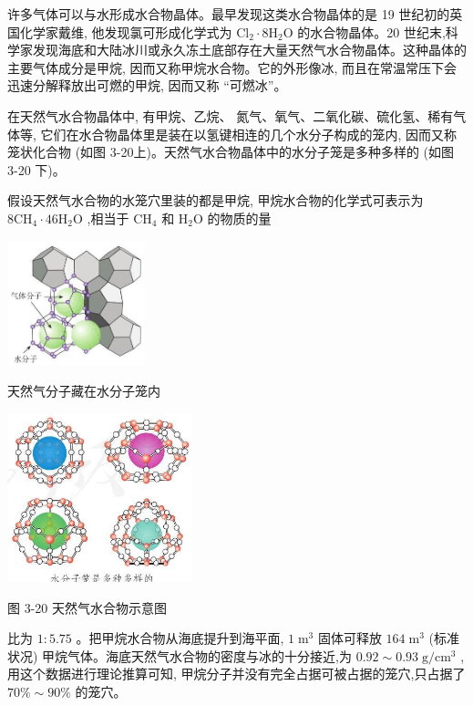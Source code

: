 \documentclass[10pt]{article}
\begin{document}
许多气体可以与水形成水合物晶体。最早发现这类水合物晶体的是 19 世纪初的英国化学家戴维, 他发现氯可形成化学式为 \({\mathrm{{Cl}}}_{2} \cdot 8{\mathrm{H}}_{2}\mathrm{O}\) 的水合物晶体。20 世纪末,科学家发现海底和大陆冰川或永久冻土底部存在大量天然气水合物晶体。这种晶体的主要气体成分是甲烷, 因而又称甲烷水合物。它的外形像冰, 而且在常温常压下会迅速分解释放出可燃的甲烷, 因而又称 “可燃冰”。

在天然气水合物晶体中, 有甲烷、乙烷、 氮气、氧气、二氧化碳、硫化氢、稀有气体等, 它们在水合物晶体里是装在以氢键相连的几个水分子构成的笼内, 因而又称笼状化合物 (如图 3-20上)。天然气水合物晶体中的水分子笼是多种多样的 (如图 3-20 下)。

假设天然气水合物的水笼穴里装的都是甲烷, 甲烷水合物的化学式可表示为 \(8{\mathrm{{CH}}}_{4} \cdot {46}{\mathrm{H}}_{2}\mathrm{O}\) ,相当于 \({\mathrm{{CH}}}_{4}\) 和 \({\mathrm{H}}_{2}\mathrm{O}\) 的物质的量

\begin{center}
\includegraphics[max width=0.3\textwidth]{images/0190e026-5a11-7df7-bd27-54d09026ba7a_83_507640.jpg}
\end{center}

天然气分子藏在水分子笼内

\begin{center}
\includegraphics[max width=0.4\textwidth]{images/0190e026-5a11-7df7-bd27-54d09026ba7a_83_242682.jpg}
\end{center}

图 3-20 天然气水合物示意图

比为 \(1 : {5.75}\) 。把甲烷水合物从海底提升到海平面, \(1{\mathrm{\;m}}^{3}\) 固体可释放 \({164}{\mathrm{\;m}}^{3}\) (标准状况) 甲烷气体。海底天然气水合物的密度与冰的十分接近,为 \({0.92} \sim {0.93}\mathrm{\;g}/{\mathrm{{cm}}}^{3}\) ,用这个数据进行理论推算可知, 甲烷分子并没有完全占据可被占据的笼穴,只占据了 \({70}\% \sim {90}\%\) 的笼穴。
\end{document}

